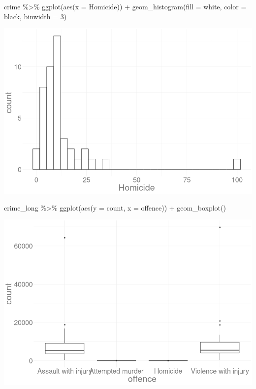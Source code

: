 \documentclass[
]{book}
\newenvironment{Shaded}{\begin{snugshade}}{\end{snugshade}}
\newcommand{\AttributeTok}[1]{\textcolor[rgb]{0.77,0.63,0.00}{#1}}
\newcommand{\DecValTok}[1]{\textcolor[rgb]{0.00,0.00,0.81}{#1}}
\newcommand{\FunctionTok}[1]{\textcolor[rgb]{0.00,0.00,0.00}{#1}}
\newcommand{\NormalTok}[1]{#1}
\newcommand{\SpecialCharTok}[1]{\textcolor[rgb]{0.00,0.00,0.00}{#1}}
\newcommand{\StringTok}[1]{\textcolor[rgb]{0.31,0.60,0.02}{#1}}
\begin{document}
\begin{Shaded}
\begin{Highlighting}[]
\NormalTok{crime }\SpecialCharTok{\%\textgreater{}\%} 
  \FunctionTok{ggplot}\NormalTok{(}\FunctionTok{aes}\NormalTok{(}\AttributeTok{x =}\NormalTok{ Homicide)) }\SpecialCharTok{+}
  \FunctionTok{geom\_histogram}\NormalTok{(}\AttributeTok{fill =} \StringTok{\textquotesingle{}white\textquotesingle{}}\NormalTok{,}
                 \AttributeTok{color =} \StringTok{\textquotesingle{}black\textquotesingle{}}\NormalTok{,}
                 \AttributeTok{binwidth =} \DecValTok{3}\NormalTok{)}
\end{Highlighting}
\end{Shaded}

\begin{center}\includegraphics[width=12in]{imgs/pts4} \end{center}

\begin{Shaded}
\begin{Highlighting}[]
\NormalTok{crime\_long }\SpecialCharTok{\%\textgreater{}\%} 
  \FunctionTok{ggplot}\NormalTok{(}\FunctionTok{aes}\NormalTok{(}\AttributeTok{y =}\NormalTok{ count, }
             \AttributeTok{x =}\NormalTok{ offence)) }\SpecialCharTok{+}
  \FunctionTok{geom\_boxplot}\NormalTok{()}
\end{Highlighting}
\end{Shaded}

\begin{center}\includegraphics[width=12in]{imgs/pts5} \end{center}
\end{document}
